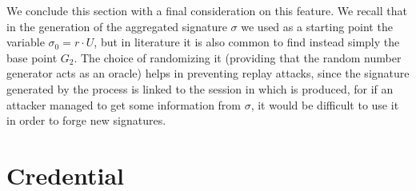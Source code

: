 \documentclass[twocolumn]{article}
\begin{document}
We conclude this section with a final consideration on this feature. We recall that in the generation of the aggregated signature $\sigma$ we used as a starting point the variable $\sigma_0 = r\cdot U$, but in literature it is also common to find instead simply the base point $G_2$. The choice of randomizing it (providing that the random number generator acts as an oracle) helps in preventing replay attacks, since the signature generated by the process is linked to the session in which is produced, for if an attacker managed to get some information from $\sigma$, it would be difficult to use it in order to forge new signatures.

\section{Credential}
\label{sec:credential}
\end{document}
